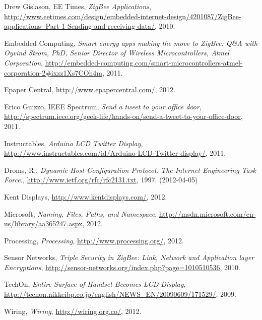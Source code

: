 \documentclass[a4paper,11pt]{article}
\begin{document}
\begin{thebibliography}{9}
\label{eetimes}
    Drew Gislason, 
    EE Times,
    \emph{ZigBee Applications},
    \url{ http://www.eetimes.com/design/embedded-internet-design/4201087/ZigBee-applications--Part-1-Sending-and-receiving-data/},
    2010.

\label{embedded}
    Embedded Computing,
    \emph{Smart energy apps making the move to ZigBee: Q\&A with Oyvind Strom, PhD, Senior Director of Wireless Microcontrollers, Atmel Corporation},
    \url{http://embedded-computing.com/smart-microcontrollers-atmel-corporation-2#ixzz1Xs7COh4m},
    2011.

\label{epapercentral}
    Epaper Central,
    \url{http://www.epapercentral.com/},
    2012.

\label{spectrum}
    Erico Guizzo, 
    IEEE Spectrum,
    \emph{Send a tweet to your office door},
    \url{http://spectrum.ieee.org/geek-life/hands-on/send-a-tweet-to-your-office-door},
    2011.

\label{instructables}
    Instructables,
    \emph{Arduino LCD Twitter Display},
    \url{http://www.instructables.com/id/Arduino-LCD-Twitter-display/},
    2011.

\label{droms}
    Droms, R.,
    \emph{Dynamic Host Configuration Protocol. The Internet Engineering Task Force.},
    \url{http://www.ietf.org/rfc/rfc2131.txt},
    1997. (2012-04-05)

\label{kent}
    Kent Displays,
    \url{http://www.kentdisplays.com/},
    2012.

\label{microsoft}
    Microsoft,
    \emph{Naming, Files, Paths, and Namespace},
    \url{http://msdn.microsoft.com/en-us/library/aa365247.aspx},
    2012.

\label{processing}
    Processing,
    \emph{Processing},
    \url{http://www.processing.org/},
    2012.

\label{sensornetworks}
    Sensor Networks,
    \emph{Triple Security in ZigBee: Link, Network and Application layer Encryptions},
    \url{http://sensor-networks.org/index.php?page=1010510536},
    2010.

\label{techon}
    TechOn,
    \emph{Entire Surface of Handset Becomes LCD Display},
    \url{http://techon.nikkeibp.co.jp/english/NEWS_EN/20090609/171529/},
    2009.

\label{wiring}
    Wiring,
    \emph{Wiring},
    \url{http://wiring.org.co/},
    2012.


\end{thebibliography}
\end{document}
